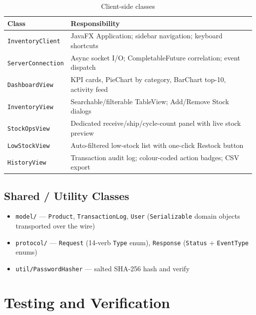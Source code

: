 \documentclass[12pt,a4paper]{article}
\begin{document}
\begin{table}[H]
\centering
\begin{tabularx}{\linewidth}{lX}
\toprule
\textbf{Class} & \textbf{Responsibility} \\
\midrule
\texttt{InventoryClient}    & JavaFX Application; sidebar navigation; keyboard shortcuts \\
\texttt{ServerConnection}   & Async socket I/O; CompletableFuture correlation; event dispatch \\
\texttt{DashboardView}      & KPI cards, PieChart by category, BarChart top-10, activity feed \\
\texttt{InventoryView}      & Searchable/filterable TableView; Add/Remove Stock dialogs \\
\texttt{StockOpsView}       & Dedicated receive/ship/cycle-count panel with live stock preview \\
\texttt{LowStockView}       & Auto-filtered low-stock list with one-click Restock button \\
\texttt{HistoryView}        & Transaction audit log; colour-coded action badges; CSV export \\
\bottomrule
\end{tabularx}
\caption{Client-side classes}
\end{table}

\subsection{Shared / Utility Classes}

\begin{itemize}[leftmargin=1.4em]
  \item \texttt{model/} --- \texttt{Product}, \texttt{TransactionLog}, \texttt{User}
        (\texttt{Serializable} domain objects transported over the wire)
  \item \texttt{protocol/} --- \texttt{Request} (14-verb \texttt{Type} enum),
        \texttt{Response} (\texttt{Status} + \texttt{EventType} enums)
  \item \texttt{util/PasswordHasher} --- salted SHA-256 hash and verify
\end{itemize}

\section{Testing and Verification}
\end{document}
